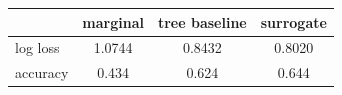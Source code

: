 \begin{tabular}{lccc}
\toprule
 & marginal & tree baseline & surrogate \\
\midrule
log loss & 1.0744 & 0.8432 & 0.8020 \\
accuracy & 0.434 & 0.624 & 0.644 \\
\bottomrule
\end{tabular}

